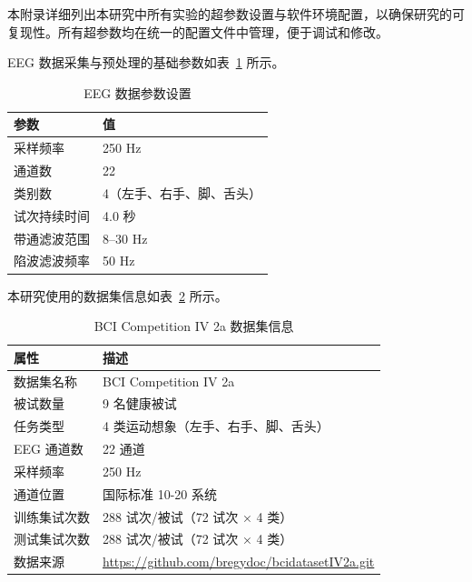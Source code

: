 
\label{chap:appendix}

本附录详细列出本研究中所有实验的超参数设置与软件环境配置，以确保研究的可复现性。所有超参数均在统一的配置文件中管理，便于调试和修改。

\label{sec:data_and_dataset}

EEG 数据采集与预处理的基础参数如表~\ref{tab:eeg_params} 所示。

\begin{table}[H]
\centering
\caption{EEG 数据参数设置}
\label{tab:eeg_params}
\begin{tabular}{ll}
\hline
\textbf{参数} & \textbf{值} \\
\hline
采样频率 & 250 Hz \\
通道数 & 22 \\
类别数 & 4（左手、右手、脚、舌头） \\
试次持续时间 & 4.0 秒 \\
带通滤波范围 & 8--30 Hz \\
陷波滤波频率 & 50 Hz \\
\hline
\end{tabular}
\end{table}

本研究使用的数据集信息如表~\ref{tab:dataset_info} 所示。

\begin{table}[H]
\centering
\caption{BCI Competition IV 2a 数据集信息}
\label{tab:dataset_info}
\begin{tabular}{ll}
\hline
\textbf{属性} & \textbf{描述} \\
\hline
数据集名称 & BCI Competition IV 2a \\
被试数量 & 9 名健康被试 \\
任务类型 & 4 类运动想象（左手、右手、脚、舌头） \\
EEG 通道数 & 22 通道 \\
采样频率 & 250 Hz \\
通道位置 & 国际标准 10-20 系统 \\
训练集试次数 & 288 试次/被试（72 试次 × 4 类） \\
测试集试次数 & 288 试次/被试（72 试次 × 4 类） \\
数据来源 & \url{https://github.com/bregydoc/bcidatasetIV2a.git} \\
\hline
\end{tabular}
\end{table}

